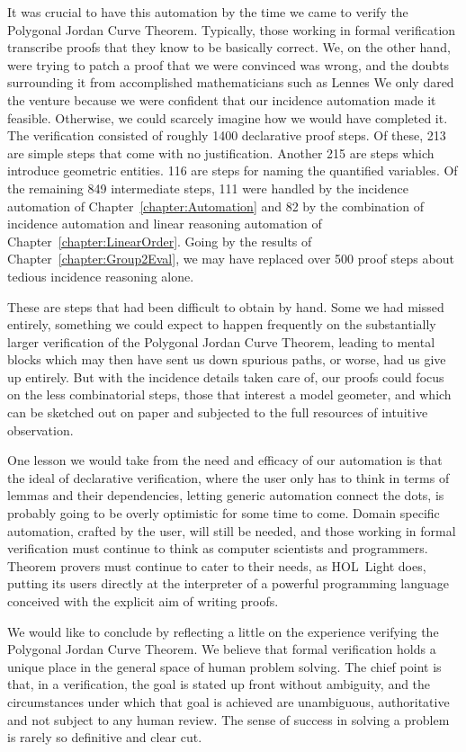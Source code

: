 It was crucial to have this automation by the time we came to verify the Polygonal Jordan Curve Theorem. Typically, those working in formal verification transcribe proofs that they know to be basically correct. We, on the other hand, were trying to patch a proof that we were convinced was wrong, and the doubts surrounding it from accomplished mathematicians such as Lennes We only dared the venture because we were confident that our incidence automation made it feasible. Otherwise, we could scarcely imagine how we would have completed it. The verification consisted of roughly 1400 declarative proof steps. Of these, 213 are simple  steps that come with no justification. Another 215 are  steps which introduce geometric entities. 116 are  steps for naming the quantified variables. Of the remaining 849 intermediate steps, 111 were handled by the incidence automation of Chapter~\ref{chapter:Automation} and 82 by the combination of incidence automation and linear reasoning automation of Chapter~\ref{chapter:LinearOrder}. Going by the results of Chapter~\ref{chapter:Group2Eval}, we may have replaced over 500 proof steps about tedious incidence reasoning alone.

These are steps that had been difficult to obtain by hand. Some we had missed entirely, something we could expect to happen frequently on the substantially larger verification of the Polygonal Jordan Curve Theorem, leading to mental blocks which may then have sent us down spurious paths, or worse, had us give up entirely. But with the incidence details taken care of, our proofs could focus on the less combinatorial steps, those that interest a model geometer, and which can be sketched out on paper and subjected to the full resources of intuitive observation.

One lesson we would take from the need and efficacy of our automation is that the ideal of declarative verification, where the user only has to think in terms of lemmas and their dependencies, letting generic automation connect the dots, is probably going to be overly optimistic for some time to come. Domain specific automation, crafted by the user, will still be needed, and those working in formal verification must continue to think as computer scientists and programmers. Theorem provers must continue to cater to their needs, as HOL~Light does, putting its users directly at the interpreter of a powerful programming language conceived with the explicit aim of writing proofs.

We would like to conclude by reflecting a little on the experience verifying the Polygonal Jordan Curve Theorem. We believe that formal verification holds a unique place in the general space of human problem solving. The chief point is that, in a verification, the goal is stated up front without ambiguity, and the circumstances under which that goal is achieved are unambiguous, authoritative and not subject to any human review. The sense of success in solving a problem is rarely so definitive and clear cut.


